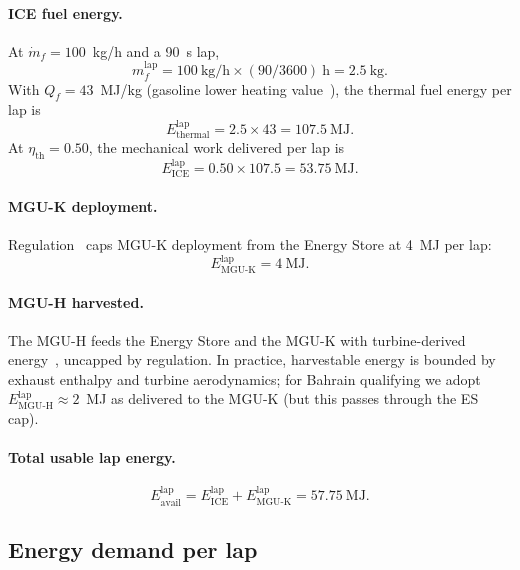 \documentclass[11pt,twocolumn]{article}
\theoremstyle{definition}
\theoremstyle{remark}
\begin{document}
\paragraph{ICE fuel energy.}
At $\dot m_f = 100$~kg/h and a 90~s lap,
\[
  m_f^{\mathrm{lap}} = 100~\mathrm{kg/h} \times (90/3600)~\mathrm{h}
  = 2.5~\mathrm{kg}.
\]
With $Q_f = 43$~MJ/kg (gasoline lower heating value~\cite{heywood1988,stone1999}),
the thermal fuel energy per lap is
\begin{equation}
  E_{\mathrm{thermal}}^{\mathrm{lap}} = 2.5 \times 43 = 107.5~\mathrm{MJ}.
\end{equation}
At $\eta_{\mathrm{th}} = 0.50$, the mechanical work delivered per lap is
\begin{equation}
  E_{\mathrm{ICE}}^{\mathrm{lap}} = 0.50 \times 107.5 = 53.75~\mathrm{MJ}.
\end{equation}

\paragraph{MGU-K deployment.}
Regulation~\cite{fia2023tech} caps MGU-K deployment from the Energy Store at 4~MJ per lap:
\begin{equation}
  E_{\mathrm{MGU\text{-}K}}^{\mathrm{lap}} = 4~\mathrm{MJ}.
\end{equation}

\paragraph{MGU-H harvested.}
The MGU-H feeds the Energy Store and the MGU-K with turbine-derived
energy~\cite{turbocharging2015,larminie2012,ehsani2018}, uncapped by
regulation. In practice, harvestable energy is bounded by exhaust
enthalpy and turbine aerodynamics; for Bahrain qualifying we adopt
$E_{\mathrm{MGU\text{-}H}}^{\mathrm{lap}} \approx 2$~MJ as delivered
to the MGU-K (but this passes through the ES cap).

\paragraph{Total usable lap energy.}
\begin{equation}
  E_{\mathrm{avail}}^{\mathrm{lap}} = E_{\mathrm{ICE}}^{\mathrm{lap}}
  + E_{\mathrm{MGU\text{-}K}}^{\mathrm{lap}} = 57.75~\mathrm{MJ}.
\end{equation}

\subsection{Energy demand per lap}
\end{document}
